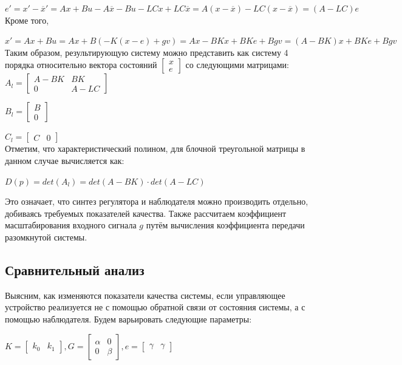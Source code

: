 $e'=x'-\overline{x}'=Ax+Bu-A\overline{x}-Bu-LCx+LC\overline{x}=A(x-\overline{x})-LC(x-\overline{x})=(A-LC)e$\\

Кроме того,

$x'=Ax+Bu=Ax+B(-K(x-e)+gv)=Ax-BKx+BKe+Bgv=(A-BK)x+BKe+Bgv$\\

Таким образом, результирующую систему можно представить как систему 4 порядка относительно вектора состояний
$\begin{bmatrix} x \\ e \end{bmatrix}$
со следующими матрицами:\\

$A_{l}=\begin{bmatrix} A-BK & BK \\ 0 & A-LC \end{bmatrix}$

$B_{l}=\begin{bmatrix} B \\ 0 \end{bmatrix}$

$C_{l}=\begin{bmatrix} C & 0 \end{bmatrix}$\\

Отметим, что характеристический полином, для блочной треугольной матрицы в данном случае вычисляется как:

$D(p)=det(A_{l})=det(A-BK)\cdot det(A-LC)$

Это означает, что синтез регулятора и наблюдателя можно производить отдельно, добиваясь требуемых показателей качества. Также рассчитаем коэффициент масштабирования входного сигнала $g$ путём вычисления коэффициента передачи разомкнутой системы.

\newpage
\subsection{Сравнительный анализ}

Выясним, как изменяются показатели качества системы, если управляющее устройство реализуется не с помощью обратной связи от состояния системы, а с помощью наблюдателя. Будем варьировать следующие параметры:

\begin{center}
$K=\begin{bmatrix} k_0 & k_1 \end{bmatrix}, G=\begin{bmatrix} \alpha & 0 \\ 0 & \beta \end{bmatrix}, e=\begin{bmatrix} \gamma & \gamma \end{bmatrix}$
\end{center}


